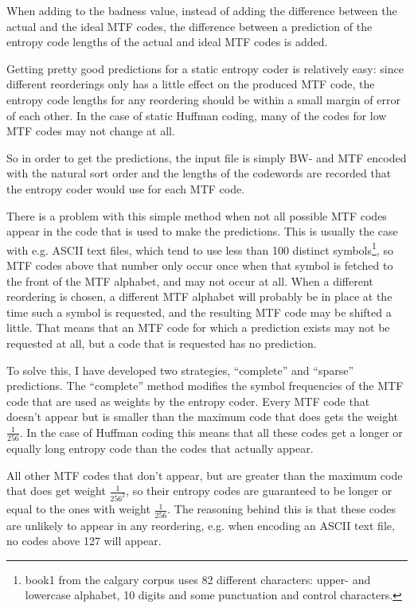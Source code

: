 \documentclass[a4paper]{scrreprt}
\begin{document}
When adding to the badness value, instead of adding the difference between the
actual and the ideal MTF codes, the difference between a prediction of the
entropy code lengths of the actual and ideal MTF codes is added.

Getting pretty good predictions for a static entropy coder is relatively easy:
since different reorderings only has a little effect on the produced MTF code,
the entropy code lengths for any reordering should be within a small margin of
error of each other. In the case of static Huffman coding, many of the codes for
low MTF codes may not change at all.

So in order to get the predictions, the input file is simply BW- and MTF encoded
with the natural sort order and the lengths of the codewords are recorded that
the entropy coder would use for each MTF code.

There is a problem with this simple method when not all possible MTF codes
appear in the code that is used to make the predictions. This is usually the
case with e.g. ASCII text files, which tend to use less than 100 distinct
symbols\footnote{book1 from the calgary corpus uses 82 different characters:
upper- and lowercase alphabet, 10 digits and some punctuation and control
characters.}, so MTF codes above that number only occur once when that symbol is
fetched to the front of the MTF alphabet, and may not occur at all.
When a different reordering is chosen, a different MTF alphabet will probably be
in place at the time such a symbol is requested, and the resulting MTF code may
be shifted a little. That means that an MTF code for which a prediction exists
may not be requested at all, but a code that is requested has no prediction.

To solve this, I have developed two strategies, ``complete'' and ``sparse''
predictions.
The ``complete'' method modifies the symbol frequencies of the MTF code that are
used as weights by the entropy coder. Every MTF code that doesn't appear but is
smaller than the maximum code that does gets the weight \(\frac{1}{256}\). In
the case of Huffman coding this means that all these codes get a longer or
equally long entropy code than the codes that actually appear.

All other MTF codes that don't appear, but are greater than the maximum code
that does get weight \(\frac{1}{256^2}\), so their entropy codes are guaranteed
to be longer or equal to the ones with weight \(\frac{1}{256}\). The reasoning
behind this is that these codes are unlikely to appear in any reordering, e.g.
when encoding an ASCII text file, no codes above 127 will appear.
\end{document}
